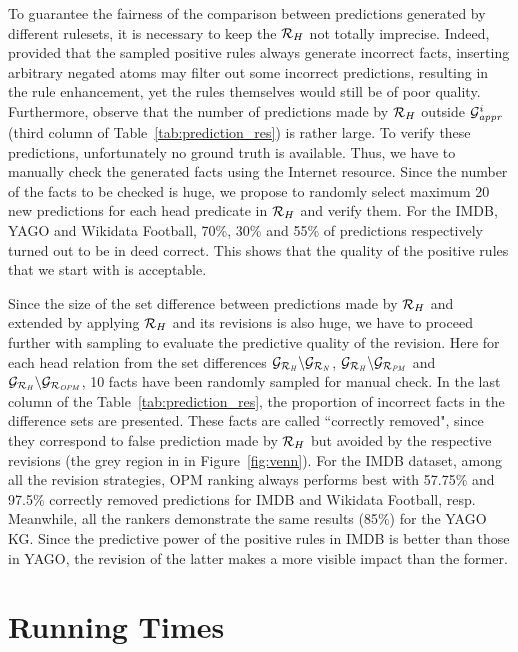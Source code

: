 To guarantee the fairness of the comparison between predictions generated by different rulesets, it is necessary to keep the $\mathcal{R}_H$ not totally imprecise. Indeed, provided that the sampled positive rules always generate incorrect facts, inserting arbitrary negated atoms may filter out some incorrect predictions, resulting in the rule enhancement, yet the rules themselves would still be of poor quality. Furthermore, observe that the number of predictions made by $\mathcal{R}_H$ outside $\mathcal{G}^i_{\mathit{appr}}$ (third column of Table~\ref{tab:prediction_res}) is rather large. To verify these predictions, unfortunately no ground truth is available. Thus, we have to manually check the generated facts using the Internet resource. Since the number of the facts to be checked is huge, we propose to randomly select maximum 20 new predictions for each head predicate in $\mathcal{R}_H$ and verify them. For the IMDB, YAGO and Wikidata Football, 70\%, 30\% and 55\% of predictions respectively turned out to be in deed correct. This shows that the quality of the positive rules that we start with is acceptable.

Since the size of the set difference between predictions made by $\mathcal{R}_H$ and extended by applying $\mathcal{R}_H$ and its revisions is also huge, we have to proceed further with sampling to evaluate the predictive quality of the revision. Here for each head relation from the set differences $\mathcal{G}_{\mathcal{R}_{\mathit{H}}}\backslash \mathcal{G}_{\mathcal{R}_{\mathit{N}}}$, $\mathcal{G}_{\mathcal{R}_{\mathit{H}}}\backslash \mathcal{G}_{\mathcal{R}_{\mathit{PM}}}$ and $\mathcal{G}_{\mathcal{R}_{\mathit{H}}}\backslash \mathcal{G}_{\mathcal{R}_{\mathit{OPM}}}$, 10 facts have been randomly sampled for manual check. In the last column of the Table~\ref{tab:prediction_res}, the proportion of incorrect facts in the difference sets are presented. These facts are called ``correctly removed", since they correspond to false prediction made by $\mathcal{R}_H$ but avoided by the respective revisions (the grey region in in Figure~\ref{fig:venn}). For the IMDB dataset, among all the revision strategies, OPM ranking always performs best with 57.75\% and 97.5\% correctly removed predictions for IMDB and Wikidata Football, resp. Meanwhile, all the rankers demonstrate the same results (85\%) for the YAGO KG. Since the predictive power of the positive rules in IMDB is better than those in YAGO, the revision of the latter makes a more visible impact than the former.

\section{Running Times}

